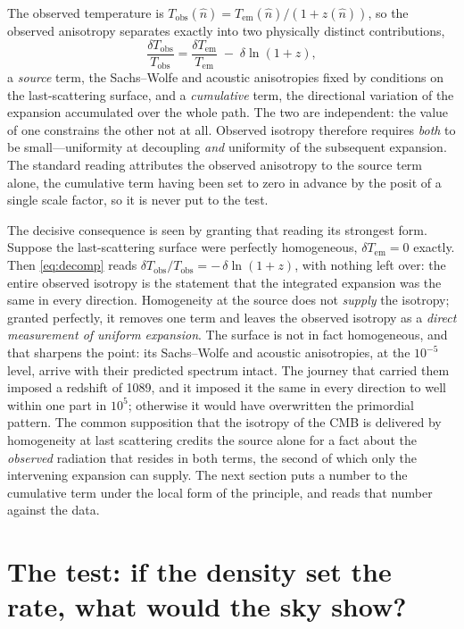 \documentclass[aps,prd,reprint,amsmath,amssymb,superscriptaddress]{revtex4-2}
\begin{document}
The observed temperature is $T_{\mathrm{obs}}(\hat n) = T_{\mathrm{em}}(\hat n)/(1+z(\hat n))$, so the observed anisotropy separates exactly into two physically distinct contributions,
\begin{equation}
\frac{\delta T_{\mathrm{obs}}}{T_{\mathrm{obs}}} = \frac{\delta T_{\mathrm{em}}}{T_{\mathrm{em}}} \;-\; \delta\ln(1+z),
\label{eq:decomp}
\end{equation}
a \emph{source} term, the Sachs--Wolfe and acoustic anisotropies fixed by conditions on the last-scattering surface, and a \emph{cumulative} term, the directional variation of the expansion accumulated over the whole path. The two are independent: the value of one constrains the other not at all. Observed isotropy therefore requires \emph{both} to be small---uniformity at decoupling \emph{and} uniformity of the subsequent expansion. The standard reading attributes the observed anisotropy to the source term alone, the cumulative term having been set to zero in advance by the posit of a single scale factor, so it is never put to the test.

The decisive consequence is seen by granting that reading its strongest form. Suppose the last-scattering surface were perfectly homogeneous, $\delta T_{\mathrm{em}} = 0$ exactly. Then \eqref{eq:decomp} reads $\delta T_{\mathrm{obs}}/T_{\mathrm{obs}} = -\,\delta\ln(1+z)$, with nothing left over: the entire observed isotropy is the statement that the integrated expansion was the same in every direction. Homogeneity at the source does not \emph{supply} the isotropy; granted perfectly, it removes one term and leaves the observed isotropy as a \emph{direct measurement of uniform expansion}. The surface is not in fact homogeneous, and that sharpens the point: its Sachs--Wolfe and acoustic anisotropies, at the $10^{-5}$ level, arrive with their predicted spectrum intact. The journey that carried them imposed a redshift of 1089, and it imposed it the same in every direction to well within one part in $10^{5}$; otherwise it would have overwritten the primordial pattern. The common supposition that the isotropy of the CMB is delivered by homogeneity at last scattering credits the source alone for a fact about the \emph{observed} radiation that resides in both terms, the second of which only the intervening expansion can supply. The next section puts a number to the cumulative term under the local form of the principle, and reads that number against the data.

\section{The test: if the density set the rate, what would the sky show?}\label{sec:floor}
\end{document}
